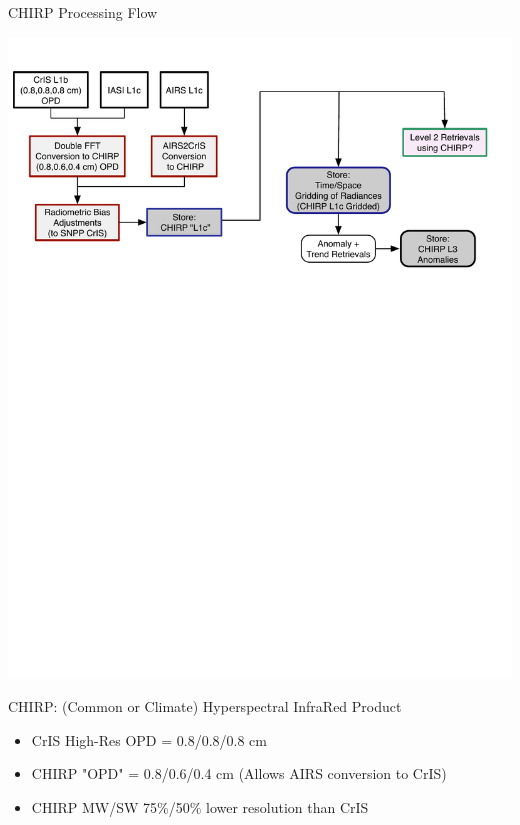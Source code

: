 \documentclass[10pt,t]{beamer}
\begin{document}
\begin{frame}[label={sec:org17583f1}]{CHIRP Processing Flow}
\vspace{-0.2in}
\begin{center}
\includegraphics[width=1.0\linewidth]{./airs2cris_stm_talk1_landscape.pdf}
\end{center}

CHIRP: (Common or Climate) Hyperspectral InfraRed Product

\vspace{0.05in}

\small
\begin{itemize}
\item CrIS High-Res OPD = 0.8/0.8/0.8 cm
\item CHIRP "OPD" = 0.8/0.6/0.4 cm  \hspace{0.1in} (Allows AIRS conversion to CrIS)
\item CHIRP MW/SW 75\%/50\% lower resolution than CrIS
\end{itemize}
\end{frame}
\end{document}
